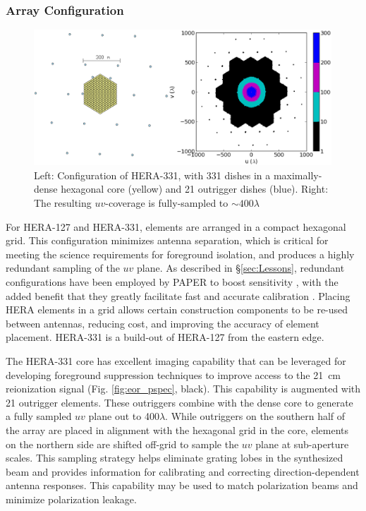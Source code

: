 \documentclass[preprint]{aastex}
\newcommand{\compress}{\vspace{-0.3in}}
\newcommand{\Caption}[4]{\vspace{#1}\renewcommand{\baselinestretch}{#2}\caption{#4}\vspace{#3}}
\begin{document}
\compress
\subsubsection{Array Configuration}

\begin{figure}[t]
\centering
		\includegraphics[height=2in]{plots/config_uv_consolidated.png}
\Caption{-0.15in}{0.9}{-0.1in}{\small
Left: Configuration of HERA-331, with 331 dishes in a maximally-dense hexagonal core (yellow) and 21 outrigger dishes (blue).  Right: The resulting $uv$-coverage is fully-sampled to $\sim 400\lambda$ 
}\label{fig:uv_coverage}
\end{figure}

For HERA-127 and HERA-331, elements are arranged in a compact hexagonal grid.
This configuration minimizes antenna separation, which is critical for meeting
the science requirements for foreground isolation, and 
produces a highly redundant sampling of the $uv$ plane.  As described in
\S\ref{sec:Lessons}, redundant configurations have been employed by PAPER to
boost sensitivity \citep{parsons_et_al2012a}, with the added benefit that they
greatly facilitate fast and accurate calibration
\citep{liu_et_al2010,parsons_et_al2013}.  Placing HERA elements in a
grid allows certain construction components to be re-used between antennas,
reducing cost, and improving the accuracy of element placement.  HERA-331 
is a build-out of HERA-127 from the eastern edge.

The HERA-331 core has excellent
imaging capability that can be leveraged for developing foreground suppression techniques
to improve access to the 21~cm reionization signal 
(Fig. \ref{fig:eor_pspec}, black).
This capability is augmented with 21 outrigger elements.  These outriggers
combine with the dense core to generate a fully
sampled $uv$ plane out to 400$\lambda$.  While outriggers on the southern half of the array are
placed in alignment with the hexagonal grid in the core, elements on the northern side are
shifted off-grid to sample the $uv$ plane at sub-aperture scales.
This sampling strategy helps eliminate grating lobes in the
synthesized beam and provides information for
calibrating and correcting direction-dependent antenna responses.  This capability may
be used to match polarization beams and minimize
polarization leakage.
\end{document}
